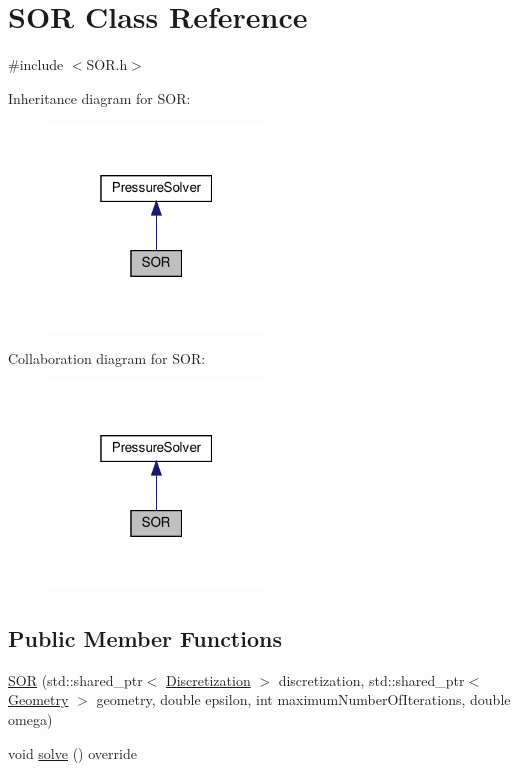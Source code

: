 \hypertarget{classSOR}{}\section{S\+OR Class Reference}
\label{classSOR}


{\ttfamily \#include $<$S\+O\+R.\+h$>$}



Inheritance diagram for S\+OR\+:\nopagebreak
\begin{figure}[H]
\begin{center}
\leavevmode
\includegraphics[width=163pt]{classSOR__inherit__graph}
\end{center}
\end{figure}


Collaboration diagram for S\+OR\+:\nopagebreak
\begin{figure}[H]
\begin{center}
\leavevmode
\includegraphics[width=163pt]{classSOR__coll__graph}
\end{center}
\end{figure}
\subsection*{Public Member Functions}
\begin{DoxyCompactItemize}
\item 
\mbox{\hyperlink{classSOR_a2d9d05fd4db988cb3b69c0e7a8cf3950}{S\+OR}} (std\+::shared\+\_\+ptr$<$ \mbox{\hyperlink{classDiscretization}{Discretization}} $>$ discretization, std\+::shared\+\_\+ptr$<$ \mbox{\hyperlink{classGeometry}{Geometry}} $>$ geometry, double epsilon, int maximum\+Number\+Of\+Iterations, double omega)
\item 
void \mbox{\hyperlink{classSOR_a860992d85d8aacf114a3a02b5831f728}{solve}} () override
\end{DoxyCompactItemize}
